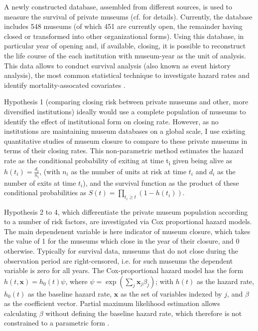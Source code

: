 \documentclass[12pt]{article}
\begin{document}
A newly constructed database, assembled from different sources,  is used to measure the survival of private museums (cf. \textcite{Velthuis_etal_2023_boom} for details).
Currently, the database includes 548 museums (of which 451 are currently open, the remainder having closed or transformed into other organizational forms).
Using this database, in particular year of opening and, if available, closing, it is possible to reconstruct the life course of the each institution with museum-year as the unit of analysis.
This data allows to conduct survival analysis (also known as event history analysis), the most common statistical technique to investigate hazard rates and identify mortality-assocated covariates \parencite{Moore_2015_survival,Allison_2014_event}.



Hypothesis 1 (comparing closing risk between private museums and other, more diversified institutions) ideally would use a complete population of museums to identify the effect of institutional form on closing rate.
However, as no institutions are maintaining museum databases on a global scale, I use existing quantitative studies of museum closure to compare to these  private museums in terms of their closing rates.
This non-parametric method estimates the hazard rate as the conditional probability of exiting at time t\textsubscript{i} given being alive as \(h(t_i) = \frac{d_i}{n_i}\), (with \(n_i\) as the number of units at risk at time \(t_i\) and \(d_i\) as the number of exits at time \(t_i\)), and the survival function as the product of these conditional probabilities as \(S(t) = \prod_{t_i \geq t} \left(1-h(t_i) \right)\).


Hypothesis 2 to 4, which differentiate the private museum population according to a number of risk factors, are investigated via Cox proportional hazard models. 
The main dependenent variable is here indicator of museum closure, which takes the value of 1 for the museums which close in the year of their closure, and 0 otherwise.
Typically for survival data, museums that do not close during the observation period are right-censored, i.e. for such museums the dependent variable is zero for all years.
The Cox-proportional hazard model has the form \(h(t,\mathbf{x}) = h_0(t) \psi\), where \(\psi = \exp(\sum_{j} \mathbf{x}_j \beta_j)\); with \(h(t)\) as the hazard rate, \(h_0(t)\) as the baseline hazard rate, \(\mathbf{x}\) as the set of variables indexed by \(j\), and \(\beta\) as the coefficient vector.
Partial maximum likelihood estimation allows calculating \(\beta\) without defining the baseline hazard rate, which therefore is not constrained to a parametric form \parencite{Moore_2015_survival}.
\end{document}
